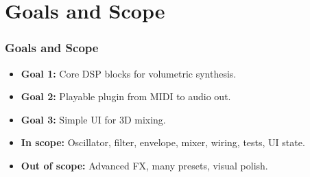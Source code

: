 \section{Goals and Scope}

\begin{frame}\frametitle{Goals and Scope}
\begin{itemize} [<+->]
    \item \textbf{Goal 1:} Core DSP blocks for volumetric synthesis.
    \item \textbf{Goal 2:} Playable plugin from MIDI to audio out.
    \item \textbf{Goal 3:} Simple UI for 3D mixing.
    \item \textbf{In scope:} Oscillator, filter, envelope, mixer, wiring, tests, UI state.
    \item \textbf{Out of scope:} Advanced FX, many presets, visual polish.
\end{itemize}
\end{frame}
